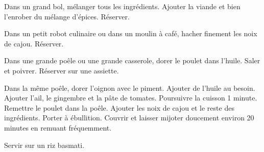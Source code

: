\begin{steps}
    \item[] 
    \item Dans un grand bol, mélanger tous les ingrédients. Ajouter la viande et bien l'enrober du mélange d'épices. Réserver.
    \item[] 
    \item Dans un petit robot culinaire ou dans un moulin à café, hacher finement les noix de cajou. Réserver.
    \item Dans une grande poêle ou une grande casserole, dorer le poulet dans l'huile. Saler et poivrer. Réserver sur une assiette.
    \item Dans la même poêle, dorer l'oignon avec le piment. Ajouter de l'huile au besoin. Ajouter l'ail, le gingembre et la pâte de tomates. Poursuivre la cuisson 1 minute. Remettre le poulet dans la poêle. Ajouter les noix de cajou et le reste des ingrédients. Porter à ébullition. Couvrir et laisser mijoter doucement environ 20 minutes en remuant fréquemment.
    \item Servir sur un riz basmati.
\end{steps}
